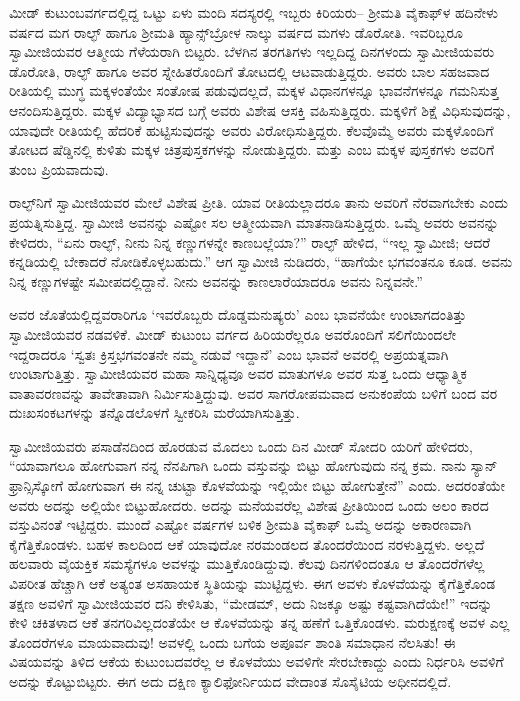 ಮೀಡ್ ಕುಟುಂಬವರ್ಗದಲ್ಲಿದ್ದ ಒಟ್ಟು ಏಳು ಮಂದಿ ಸದಸ್ಯರಲ್ಲಿ ಇಬ್ಬರು ಕಿರಿಯರು– ಶ್ರೀಮತಿ ವೈಕಾಫ್​ಳ ಹದಿನೇಳು ವರ್ಷದ ಮಗ ರಾಲ್ಫ್ ಹಾಗೂ ಶ್ರೀಮತಿ ಹ್ಯಾನ್ಸ್​ಬ್ರೋಳ ನಾಲ್ಕು ವರ್ಷದ ಮಗಳು ಡೊರೋತಿ. ಇವರಿಬ್ಬರೂ ಸ್ವಾಮೀಜಿಯವರ ಆತ್ಮೀಯ ಗೆಳೆಯರಾಗಿ ಬಿಟ್ಟರು. ಬೆಳಗಿನ ತರಗತಿಗಳು ಇಲ್ಲದಿದ್ದ ದಿನಗಳಂದು ಸ್ವಾಮೀಜಿಯವರು ಡೊರೋತಿ, ರಾಲ್ಫ್ ಹಾಗೂ ಅವರ ಸ್ನೇಹಿತರೊಂದಿಗೆ ತೋಟದಲ್ಲಿ ಆಟವಾಡುತ್ತಿದ್ದರು. ಅವರು ಬಾಲ ಸಹಜವಾದ ರೀತಿಯಲ್ಲಿ ಮುಗ್ಧ ಮಕ್ಕಳಂತೆಯೇ ಸಂತೋಷ ಪಡುವುದಲ್ಲದೆ, ಮಕ್ಕಳ ವಿಧಾನಗಳನ್ನೂ ಭಾವನೆಗಳನ್ನೂ ಗಮನಿಸುತ್ತ ಆನಂದಿಸುತ್ತಿದ್ದರು. ಮಕ್ಕಳ ವಿದ್ಯಾಭ್ಯಾಸದ ಬಗ್ಗೆ ಅವರು ವಿಶೇಷ ಆಸಕ್ತಿ ವಹಿಸುತ್ತಿದ್ದರು. ಮಕ್ಕಳಿಗೆ ಶಿಕ್ಷೆ ವಿಧಿಸುವುದನ್ನು, ಯಾವುದೇ ರೀತಿಯಲ್ಲಿ ಹೆದರಿಕೆ ಹುಟ್ಟಿಸುವುದನ್ನು ಅವರು ವಿರೋಧಿಸುತ್ತಿದ್ದರು. ಕೆಲವೊಮ್ಮೆ ಅವರು ಮಕ್ಕಳೊಂದಿಗೆ ತೋಟದ ಷೆಡ್ಡಿನಲ್ಲಿ ಕುಳಿತು ಮಕ್ಕಳ ಚಿತ್ರಪುಸ್ತಕಗಳನ್ನು ನೋಡುತ್ತಿದ್ದರು.  ಮತ್ತು  ಎಂಬ ಮಕ್ಕಳ ಪುಸ್ತಕಗಳು ಅವರಿಗೆ ತುಂಬ ಪ್ರಿಯವಾದುವು.

ರಾಲ್ಫ್​ನಿಗೆ ಸ್ವಾಮೀಜಿಯವರ ಮೇಲೆ ವಿಶೇಷ ಪ್ರೀತಿ. ಯಾವ ರೀತಿಯಲ್ಲಾದರೂ ತಾನು ಅವರಿಗೆ ನೆರವಾಗಬೇಕು ಎಂದು ಪ್ರಯತ್ನಿಸುತ್ತಿದ್ದ. ಸ್ವಾಮೀಜಿ ಅವನನ್ನು ಎಷ್ಟೋ ಸಲ ಆತ್ಮೀಯವಾಗಿ ಮಾತನಾಡಿಸುತ್ತಿದ್ದರು. ಒಮ್ಮೆ ಅವರು ಅವನನ್ನು ಕೇಳಿದರು, “ಏನು ರಾಲ್ಫ್, ನೀನು ನಿನ್ನ ಕಣ್ಣುಗಳನ್ನೇ ಕಾಣಬಲ್ಲೆಯಾ?” ರಾಲ್ಫ್ ಹೇಳಿದ, “ಇಲ್ಲ ಸ್ವಾಮೀಜಿ; ಆದರೆ ಕನ್ನಡಿಯಲ್ಲಿ ಬೇಕಾದರೆ ನೋಡಿಕೊಳ್ಳಬಹುದು.” ಆಗ ಸ್ವಾಮೀಜಿ ನುಡಿದರು, “ಹಾಗೆಯೇ ಭಗವಂತನೂ ಕೂಡ. ಅವನು ನಿನ್ನ ಕಣ್ಣುಗಳಷ್ಟೇ ಸಮೀಪದಲ್ಲಿದ್ದಾನೆ. ನೀನು ಅವನನ್ನು ಕಾಣಲಾರೆಯಾದರೂ ಅವನು ನಿನ್ನವನೇ.”

ಅವರ ಜೊತೆಯಲ್ಲಿದ್ದವರಾರಿಗೂ ‘ಇವರೊಬ್ಬರು ದೊಡ್ಡಮನುಷ್ಯರು’ ಎಂಬ ಭಾವನೆಯೇ ಉಂಟಾಗದಂತಿತ್ತು ಸ್ವಾಮೀಜಿಯವರ ನಡವಳಿಕೆ. ಮೀಡ್ ಕುಟುಂಬ ವರ್ಗದ ಹಿರಿಯರೆಲ್ಲರೂ ಅವರೊಂದಿಗೆ ಸಲಿಗೆಯಿಂದಲೇ ಇದ್ದರಾದರೂ ‘ಸ್ವತಃ ಕ್ರಿಸ್ತಭಗವಂತನೇ ನಮ್ಮ ನಡುವೆ ಇದ್ದಾನೆ’ ಎಂಬ ಭಾವನೆ ಅವರಲ್ಲಿ ಅಪ್ರಯತ್ನವಾಗಿ ಉಂಟಾಗುತ್ತಿತ್ತು. ಸ್ವಾಮೀಜಿಯವರ ಮಹಾ ಸಾನ್ನಿಧ್ಯವೂ ಅವರ ಮಾತುಗಳೂ ಅವರ ಸುತ್ತ ಒಂದು ಆಧ್ಯಾತ್ಮಿಕ ವಾತಾವರಣವನ್ನು ತಾವೇತಾವಾಗಿ ನಿರ್ಮಿಸುತ್ತಿದ್ದುವು. ಅವರ ಸಾಗರೋಪಮವಾದ ಅನುಕಂಪೆಯ ಬಳಿಗೆ ಬಂದ ವರ ದುಃಖಸಂಕಟಗಳನ್ನು ತನ್ನೊಡಲೊಳಗೆ ಸ್ವೀಕರಿಸಿ ಮರೆಯಾಗಿಸುತ್ತಿತ್ತು.

ಸ್ವಾಮೀಜಿಯವರು ಪಸಾಡೆನದಿಂದ ಹೊರಡುವ ಮೊದಲು ಒಂದು ದಿನ ಮೀಡ್ ಸೋದರಿ ಯರಿಗೆ ಹೇಳಿದರು, “ಯಾವಾಗಲೂ ಹೋಗುವಾಗ ನನ್ನ ನೆನಪಿಗಾಗಿ ಒಂದು ವಸ್ತುವನ್ನು ಬಿಟ್ಟು ಹೋಗುವುದು ನನ್ನ ಕ್ರಮ. ನಾನು ಸ್ಯಾನ್ ಫ್ರಾನ್ಸಿಸ್ಕೋಗೆ ಹೋಗುವಾಗ ಈ ನನ್ನ ಚುಟ್ಟಾ ಕೊಳವೆಯನ್ನು ಇಲ್ಲಿಯೇ ಬಿಟ್ಟು ಹೋಗುತ್ತೇನೆ” ಎಂದು. ಅದರಂತೆಯೇ ಅವರು ಅದನ್ನು ಅಲ್ಲಿಯೇ ಬಿಟ್ಟುಹೋದರು. ಅದನ್ನು ಮನೆಯವರೆಲ್ಲ ವಿಶೇಷ ಪ್ರೀತಿಯಿಂದ ಒಂದು ಅಲಂ ಕಾರದ ವಸ್ತುವಿನಂತೆ ಇಟ್ಟಿದ್ದರು. ಮುಂದೆ ಎಷ್ಟೋ ವರ್ಷಗಳ ಬಳಿಕ ಶ್ರೀಮತಿ ವೈಕಾಫ್ ಒಮ್ಮೆ ಅದನ್ನು ಅಕಾರಣವಾಗಿ ಕೈಗೆತ್ತಿಕೊಂಡಳು. ಬಹಳ ಕಾಲದಿಂದ ಆಕೆ ಯಾವುದೋ ನರಮಂಡಲದ ತೊಂದರೆಯಿಂದ ನರಳುತ್ತಿದ್ದಳು. ಅಲ್ಲದೆ ಹಲವಾರು ವೈಯಕ್ತಿಕ ಸಮಸ್ಯೆಗಳೂ ಅವಳನ್ನು ಮುತ್ತಿಕೊಂಡಿದ್ದುವು. ಕೆಲವು ದಿನಗಳಿಂದಂತೂ ಆ ತೊಂದರೆಗಳೆಲ್ಲ ವಿಪರೀತ ಹೆಚ್ಚಾಗಿ ಆಕೆ ಅತ್ಯಂತ ಅಸಹಾಯಕ ಸ್ಥಿತಿಯನ್ನು ಮುಟ್ಟಿದ್ದಳು. ಈಗ ಅವಳು ಕೊಳವೆಯನ್ನು ಕೈಗೆತ್ತಿಕೊಂಡ ತಕ್ಷಣ ಅವಳಿಗೆ ಸ್ವಾಮೀಜಿಯವರ ದನಿ ಕೇಳಿಸಿತು,  “ಮೇಡಮ್, ಅದು ನಿಜಕ್ಕೂ ಅಷ್ಟು ಕಷ್ಟವಾಗಿದೆಯೇ!” ಇದನ್ನು ಕೇಳಿ ಚಕಿತಳಾದ ಆಕೆ ತನಗರಿವಿಲ್ಲದಂತೆಯೇ ಆ ಕೊಳವೆಯನ್ನು ತನ್ನ ಹಣೆಗೆ ಒತ್ತಿಕೊಂಡಳು. ಮರುಕ್ಷಣಕ್ಕೆ ಅವಳ ಎಲ್ಲ ತೊಂದರೆಗಳೂ ಮಾಯವಾದುವು! ಅವಳಲ್ಲಿ ಒಂದು ಬಗೆಯ ಅಪೂರ್ವ ಶಾಂತಿ ಸಮಾಧಾನ ನೆಲಸಿತು! ಈ ವಿಷಯವನ್ನು ತಿಳಿದ ಆಕೆಯ ಕುಟುಂಬದವರೆಲ್ಲ ಆ ಕೊಳವೆಯು ಅವಳಿಗೇ ಸೇರಬೇಕಾದ್ದು ಎಂದು ನಿರ್ಧರಿಸಿ ಅವಳಿಗೆ ಅದನ್ನು ಕೊಟ್ಟುಬಿಟ್ಟರು. ಈಗ ಅದು ದಕ್ಷಿಣ ಕ್ಯಾಲಿಫೋರ್ನಿಯದ ವೇದಾಂತ ಸೊಸೈಟಿಯ ಅಧೀನದಲ್ಲಿದೆ.

